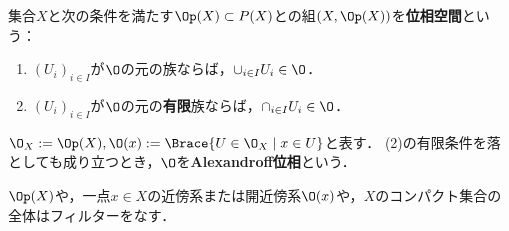 \documentclass[uplatex,dvipdfmx]{jsreport}
\begin{document}
\begin{definition}
    集合$X$と次の条件を満たす$\Op(X)\subset P(X)$との組$(X,\Op(X))$を\textbf{位相空間}という：
    \begin{enumerate}
        \item $(U_i)_{i\in I}$が$\O$の元の族ならば，$\cup_{i\in I}U_i\in\O$．
        \item $(U_i)_{i\in I}$が$\O$の元の\textbf{有限}族ならば，$\cap_{i\in I}U_i\in\O$．
    \end{enumerate}
    $\O_X:=\Op(X),\O(x):=\Brace{U\in\O_X\mid x\in U}$と表す．
    (2)の有限条件を落としても成り立つとき，$\O$を\textbf{Alexandroff位相}という．
\end{definition}

\begin{example}[近傍フィルター]
    $\Op(X)$や，一点$x\in X$の近傍系または開近傍系$\O(x)$や，$X$のコンパクト集合の全体はフィルターをなす．
\end{example}
\end{document}
